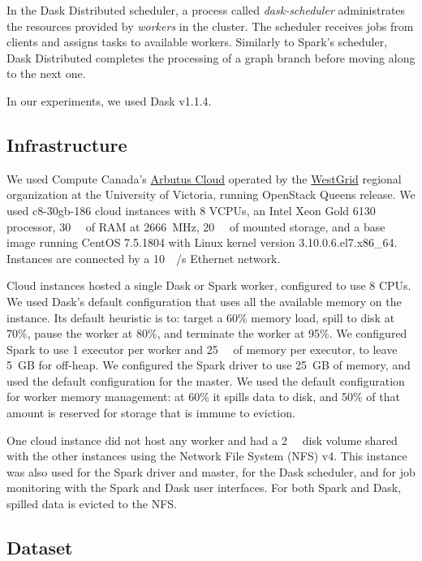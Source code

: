 \documentclass[conference]{IEEEtran}
\begin{document}
In the Dask Distributed scheduler, a process called \textit{dask-scheduler}
administrates the resources provided by \textit{workers} in the cluster. The
scheduler receives jobs from clients and assigns tasks to available workers.
Similarly to Spark's scheduler, Dask Distributed completes the processing of a
graph branch before moving along to the next one. 

In our experiments, we used Dask v1.1.4.


\subsection{Infrastructure}

 We used Compute Canada's
 \href{https://docs.computecanada.ca/wiki/Cloud\_resources}{Arbutus Cloud} operated by
 the \href{https://www.westgrid.ca}{WestGrid} regional organization at the University
 of Victoria, running OpenStack Queens release. We used c8-30gb-186 cloud
 instances with 8 VCPUs, an Intel Xeon Gold 6130 processor, \SI{30}{\giga\byte} of
 RAM at \SI{2666}{\mega\hertz}, \SI{20}{\giga\byte} of mounted storage, and a base
 image running CentOS 7.5.1804 with Linux kernel version
 3.10.0.6.el7.x86\_64. Instances are connected by a
 \SI{10}{\giga\bit/\second} Ethernet network.
 
 Cloud instances hosted a single Dask or Spark worker, configured to use 8 CPUs. We
 used Dask's default configuration that uses all the available memory on the
 instance. Its default heuristic is to: target a 60\% memory load, spill to disk at
 70\%, pause the worker at 80\%, and terminate the worker at 95\%. We configured
 Spark to use 1 executor per worker and \SI{25}{\giga\byte} of memory per executor, to leave 5~GB
 for off-heap. We configured the Spark driver to use 25~GB of memory, and used the
 default configuration for the master. We used the default configuration for worker
 memory management: at 60\% it spills data to disk, and 50\% of that amount is
 reserved for storage that is immune to eviction.
 
 One cloud instance did not host any worker and had a \SI{2}{\tera\byte} disk volume
 shared with the other instances using the Network File System (NFS) v4.
 This instance was also used for the Spark driver and master, for the
 Dask scheduler, and for job monitoring with the Spark and Dask user
 interfaces. For both Spark and Dask, spilled data is evicted to the NFS.

\subsection{Dataset}
\end{document}
